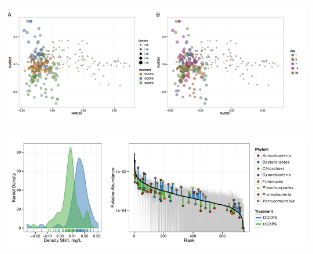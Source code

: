 \begin{figure}[H]
	\begin{center}
	\centerline{\includegraphics[width=0.7\textwidth]{figures/ordination_all1/ordination_all1.png}}
	\caption{\protect}
        \end{center}
	\label{fig:ord}
\end{figure}

\begin{figure}[H]
	\begin{center}
	\centerline{\includegraphics[width=0.7\textwidth]{figures/shift_and_rabund2/shift_and_rabund2.pdf}}
	\caption{\protect}
        \end{center}
	\label{fig:shift}
\end{figure}
